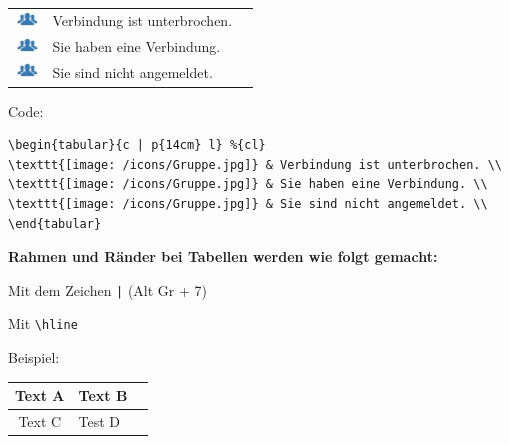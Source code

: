\begin{tabular}{c | p{14cm} l} %
\includegraphics[height=12pt]{pictures/icons/Gruppe.jpg} & Verbindung ist unterbrochen. \\
\includegraphics[height=12pt]{pictures/icons/Gruppe.jpg} & Sie haben eine Verbindung. \\
\includegraphics[height=12pt]{pictures/icons/Gruppe.jpg} & Sie sind nicht angemeldet. \\
\end{tabular}

\vspace{\baselineskip}

Code:

\begin{verbatim}
\begin{tabular}{c | p{14cm} l} %{cl}
\texttt{[image: /icons/Gruppe.jpg]} & Verbindung ist unterbrochen. \\
\texttt{[image: /icons/Gruppe.jpg]} & Sie haben eine Verbindung. \\
\texttt{[image: /icons/Gruppe.jpg]} & Sie sind nicht angemeldet. \\
\end{tabular}
\end{verbatim}

\vspace{\baselineskip}

\textbf{Rahmen und Ränder bei Tabellen werden wie folgt gemacht:}

\begin{compactitem}
	\item Mit dem Zeichen \verb+|+ (Alt Gr + 7)
	\item Mit \verb+\hline+
\end{compactitem}

\vspace{\baselineskip}

Beispiel:\\
\begin{tabular}{|c | p{10cm}|l} %
\hline
Text A & Text B \\
\hline
Text C & Test D \\
\hline
\end{tabular}

